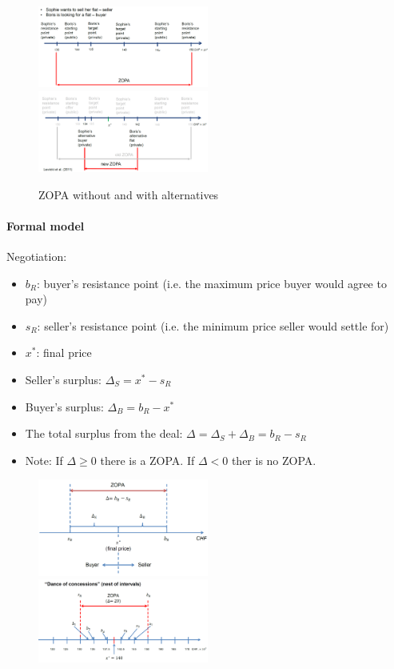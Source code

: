 \begin{figure}[H]
    \centering
    \includegraphics[width=0.5\textwidth]{Pictures/Distributive_negotiation_example_1_1.png}
    \includegraphics[width=0.5\textwidth]{Pictures/Distributive_negotiation_example_1_2.png}
    \caption{ZOPA without and with alternatives}
\end{figure}

\paragraph{Formal model}

Negotiation:

\begin{itemize}
    \item $b_R$: buyer's resistance point (i.e. the maximum price buyer would agree to pay)
    \item $s_R$: seller's resistance point (i.e. the minimum price seller would settle for)
    \item $x^\ast$: final price
    \item Seller's surplus: $\Delta_S = x^\ast - s_R$
    \item Buyer's surplus: $\Delta_B = b_R - x^\ast$
    \item The total surplus from the deal: $\Delta= \Delta_S + \Delta_B = b_R - s_R$
    \item Note: If $\Delta \geq 0$ there is a ZOPA. If $\Delta < 0$ ther is no ZOPA.
\end{itemize}

\begin{figure}[h]
    \centering
    \includegraphics[width=0.5\textwidth]{Pictures/Seller_Buyer_model.png}
    \includegraphics[width=0.5\textwidth]{Pictures/Dance_of_concessions.png}
\end{figure}

